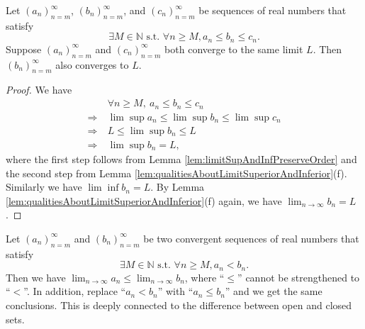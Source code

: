 \begin{thm}
  \label{thm:squeezeTest}
  Let $(a_n)_{n=m}^{\infty}$, $(b_n)_{n=m}^{\infty}$,
  and $(c_n)_{n=m}^{\infty}$ be sequences of real numbers
  that satisfy
  \begin{displaymath}
    \exists M\in \mathbb{N} \text{ s.t. }
    \forall n\ge M, a_n\le b_n \le c_n.
  \end{displaymath}
  Suppose $(a_n)_{n=m}^{\infty}$ and $(c_n)_{n=m}^{\infty}$
  both converge to the same limit $L$.
  Then $(b_n)_{n=m}^{\infty}$ also converges to $L$.
\end{thm}
\begin{proof}
  We have
  \begin{align*}
    &\ \forall n\ge M,\ a_{n} \le b_{n}\le c_{n}
    \\ \Rightarrow
    &\ \lim\sup a_{n}\le \lim\sup b_{n}\le \lim\sup c_{n}
    \\ \Rightarrow
    &\ L\le \lim\sup b_{n}\le L
    \\ \Rightarrow
    &\ \lim\sup b_{n} =L,
  \end{align*}
  where the first step follows from
  Lemma \ref{lem:limitSupAndInfPreserveOrder} and the second step from
  Lemma \ref{lem:qualitiesAboutLimitSuperiorAndInferior}(f).
  Similarly we have $\lim\inf b_{n}=L.$ By Lemma
  \ref{lem:qualitiesAboutLimitSuperiorAndInferior}(f) again,
  we have $\lim_{n\rightarrow \infty}b_{n}=L$.
\end{proof}

\begin{rem}
  Let $(a_n)_{n=m}^{\infty}$ and $(b_n)_{n=m}^{\infty}$
  be two convergent sequences of real numbers
  that satisfy
  \begin{displaymath}
    \exists M\in \mathbb{N} \text{ s.t. }
    \forall n\ge M, a_n< b_n.
  \end{displaymath}
  Then we have
  $\lim_{n\rightarrow \infty} a_n\le \lim_{n\rightarrow  \infty} b_n$, 
  where ``$\le$'' cannot be strengthened to ``$<$''.
  In addition, replace ``$a_n< b_n$''
  with ``$a_n\le b_n$'' and we get the same conclusions.
  This is deeply connected to the difference between
  open and closed sets.
\end{rem}

